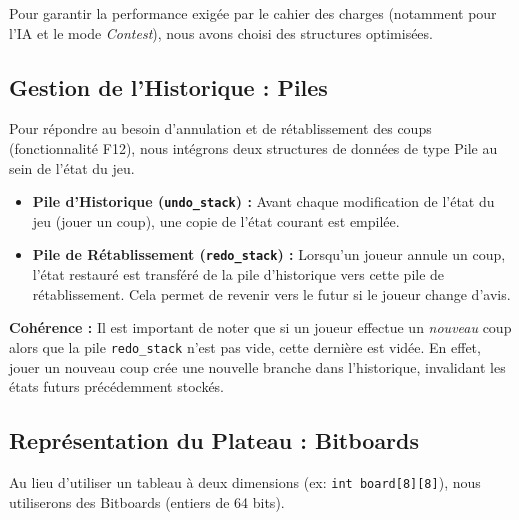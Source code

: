 \documentclass[a4paper]{article}
\begin{document}
Pour garantir la performance exigée par le cahier des charges (notamment pour l'IA et le mode \textit{Contest}), nous avons choisi des structures optimisées.
\subsection{Gestion de l'Historique : Piles}

Pour répondre au besoin d'annulation et de rétablissement des coups (fonctionnalité F12), nous intégrons deux structures de données de type Pile au sein de l'état du jeu.

\begin{itemize}
    \item \textbf{Pile d'Historique (\texttt{undo\_stack}) :} Avant chaque modification de l'état du jeu (jouer un coup), une copie de l'état courant est empilée.
    \item \textbf{Pile de Rétablissement (\texttt{redo\_stack}) :} Lorsqu'un joueur annule un coup, l'état restauré est transféré de la pile d'historique vers cette pile de rétablissement. Cela permet de revenir vers le futur si le joueur change d'avis.
\end{itemize}

\textbf{Cohérence :} Il est important de noter que si un joueur effectue un \textit{nouveau} coup alors que la pile \texttt{redo\_stack} n'est pas vide, cette dernière est vidée. En effet, jouer un nouveau coup crée une nouvelle branche dans l'historique, invalidant les états futurs précédemment stockés.

\subsection{Représentation du Plateau : Bitboards}
Au lieu d'utiliser un tableau à deux dimensions (ex: \texttt{int board[8][8]}), nous utiliserons des Bitboards (entiers de 64 bits).
\end{document}

